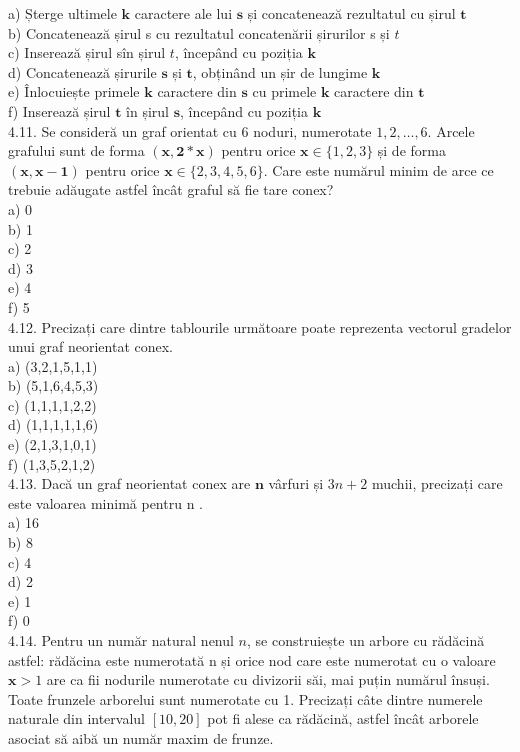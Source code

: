 a) Șterge ultimele $\mathbf{k}$ caractere ale lui $\mathbf{s}$ și concatenează rezultatul cu șirul $\mathbf{t}$
\\
b) Concatenează șirul s cu rezultatul concatenării șirurilor s și $t$
\\
c) Inserează șirul sîn șirul $t$, începând cu poziția $\mathbf{k}$
\\
d) Concatenează șirurile $\mathbf{s}$ și $\mathbf{t}$, obținând un șir de lungime $\mathbf{k}$
\\
e) Înlocuiește primele $\mathbf{k}$ caractere din $\mathbf{s}$ cu primele $\mathbf{k}$ caractere din $\mathbf{t}$
\\
f) Inserează șirul $\mathbf{t}$ în șirul $\mathbf{s}$, începând cu poziția $\mathbf{k}$
\\
4.11. Se consideră un graf orientat cu 6 noduri, numerotate $1,2, \ldots, 6$. Arcele grafului sunt de forma $(\mathbf{x}, \mathbf{2 *} \mathbf{x})$ pentru orice $\mathbf{x} \in\{1,2,3\}$ și de forma $(\mathbf{x}, \mathbf{x}-\mathbf{1})$ pentru orice $\mathbf{x} \in\{2,3,4,5,6\}$. Care este numărul minim de arce ce trebuie adăugate astfel încât graful să fie tare conex?
\\
a) 0
\\
b) 1
\\
c) 2
\\
d) 3
\\
e) 4
\\
f) 5
\\
4.12. Precizați care dintre tablourile următoare poate reprezenta vectorul gradelor unui graf neorientat conex.
\\
a) (3,2,1,5,1,1)
\\
b) (5,1,6,4,5,3)
\\
c) (1,1,1,1,2,2)
\\
d) (1,1,1,1,1,6)
\\
e) (2,1,3,1,0,1)
\\
f) (1,3,5,2,1,2)
\\
4.13. Dacă un graf neorientat conex are $\mathbf{n}$ vârfuri și $3 n+2$ muchii, precizați care este valoarea minimă pentru n .
\\
a) 16
\\
b) 8
\\
c) 4
\\
d) 2
\\
e) 1
\\
f) 0
\\
4.14. Pentru un număr natural nenul $n$, se construiește un arbore cu rădăcină astfel: rădăcina este numerotată n și orice nod care este numerotat cu o valoare $\mathbf{x}>1$ are ca fii nodurile numerotate cu divizorii săi, mai puțin numărul însuși. Toate frunzele arborelui sunt numerotate cu 1. Precizați câte dintre numerele naturale din intervalul $[10,20]$ pot fi alese ca rădăcină, astfel încât arborele asociat să aibă un număr maxim de frunze.
